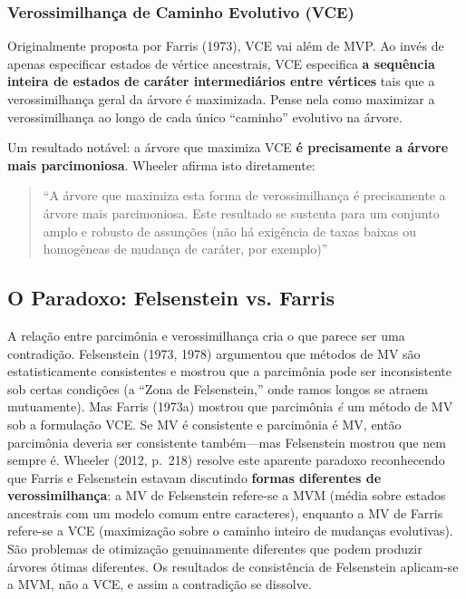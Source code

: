 \subsubsection{Verossimilhança de Caminho Evolutivo (VCE)}

Originalmente proposta por Farris (1973), VCE vai além de MVP. Ao invés de apenas especificar estados de vértice ancestrais, VCE especifica \textbf{a sequência inteira de estados de caráter intermediários entre vértices} tais que a verossimilhança geral da árvore é maximizada. Pense nela como maximizar a verossimilhança ao longo de cada único ``caminho'' evolutivo na árvore.

Um resultado notável: a árvore que maximiza VCE \textbf{é precisamente a árvore mais parcimoniosa}. Wheeler afirma isto diretamente:

\begin{quote}
``A árvore que maximiza esta forma de verossimilhança é precisamente a árvore mais parcimoniosa. Este resultado se sustenta para um conjunto amplo e robusto de assunções (não há exigência de taxas baixas ou homogêneas de mudança de caráter, por exemplo)'' \parencite{wheeler2012}
\end{quote}

\subsection{O Paradoxo: Felsenstein vs. Farris}

A relação entre parcimônia e verossimilhança cria o que parece ser uma contradição. Felsenstein (1973, 1978) argumentou que métodos de MV são estatisticamente consistentes e mostrou que a parcimônia pode ser inconsistente sob certas condições (a ``Zona de Felsenstein,'' onde ramos longos se atraem mutuamente). Mas Farris (1973a) mostrou que parcimônia \textit{é} um método de MV sob a formulação VCE. Se MV é consistente e parcimônia é MV, então parcimônia deveria ser consistente também---mas Felsenstein mostrou que nem sempre é. Wheeler (2012, p.~218) resolve este aparente paradoxo reconhecendo que Farris e Felsenstein estavam discutindo \textbf{formas diferentes de verossimilhança}: a MV de Felsenstein refere-se a MVM (média sobre estados ancestrais com um modelo comum entre caracteres), enquanto a MV de Farris refere-se a VCE (maximização sobre o caminho inteiro de mudanças evolutivas). São problemas de otimização genuinamente diferentes que podem produzir árvores ótimas diferentes. Os resultados de consistência de Felsenstein aplicam-se a MVM, não a VCE, e assim a contradição se dissolve.

